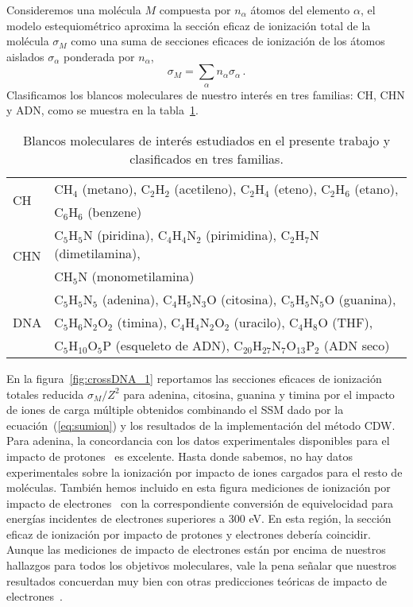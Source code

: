 Consideremos una molécula $M$ compuesta por $n_{\alpha}$ átomos del 
elemento $\alpha$, el modelo estequiométrico aproxima la sección eficaz 
de ionización total de la molécula $\sigma_{M}$ como una suma de 
secciones eficaces de ionización de los átomos aislados $\sigma_{\alpha}$ 
ponderada por $n_{\alpha}$, 
\begin{equation}
 \sigma_{M}=\sum\limits_{\alpha}n_{\alpha}\sigma_{\alpha}\,.  
 \label{eq:sumion}
\end{equation}
Clasificamos los blancos moleculares de nuestro interés en tres 
familias: CH, CHN y ADN, como se muestra en la tabla~\ref{tab:families}.

\begin{table}[t]
\begin{center}
\begin{tabular}{|p{}|p{}|}
\hline
\multirow{2}{*}{CH} & CH$_4$ (metano), C$_2$H$_2$ (acetileno), C$_2$H$_4$ (eteno), C$_2$H$_6$ (etano), \\ & C$_6$H$_6$ (benzene) \\
\hline
\multirow{2}{*}{CHN} & C$_5$H$_5$N (piridina), C$_4$H$_4$N$_2$ (pirimidina), C$_2$H$_7$N (dimetilamina), \\ & CH$_5$N (monometilamina) \\
\hline
\multirow{4}{*}{DNA} & C$_5$H$_5$N$_5$ (adenina), C$_4$H$_5$N$_3$O (citosina), C$_5$H$_5$N$_5$O (guanina), \\ & C$_5$H$_6$N$_2$O$_2$ (timina), C$_4$H$_4$N$_2$O$_2$ (uracilo), C$_4$H$_8$O (THF), \\
      & C$_5$H$_{10}$O$_5$P (esqueleto de ADN), C$_{20}$H$_{27}$N$_7$O$_{13}$P$_2$ 
(ADN seco) \\
\hline
\end{tabular}
\caption[Blancos moleculares estudiados y clasificados en tres familias.]
{Blancos moleculares de interés estudiados en el presente trabajo y 
clasificados en tres familias.}
\label{tab:families}
\end{center}
\end{table}

En la figura~\ref{fig:crossDNA_1} reportamos las secciones eficaces de 
ionización totales reducida $\sigma_M/Z^2$ para adenina, citosina, 
guanina y timina por el impacto de iones de carga múltiple obtenidos 
combinando el SSM dado por la ecuación~(\ref{eq:sumion}) y los 
resultados de la implementación del método CDW. Para adenina, la 
concordancia con los datos experimentales disponibles para el impacto 
de protones~\cite{iriki2011} es excelente. Hasta donde sabemos, no hay 
datos experimentales sobre la ionización por impacto de iones cargados 
para el resto de moléculas. También hemos incluido en esta figura 
mediciones de ionización por impacto de electrones~\cite{rahman2016} 
con la correspondiente conversión de equivelocidad para energías 
incidentes de electrones superiores a 300 eV. En esta región, la 
sección eficaz de ionización por impacto de protones y electrones 
debería coincidir. Aunque las mediciones de impacto de electrones están 
por encima de nuestros hallazgos para todos los objetivos moleculares, 
vale la pena señalar que nuestros resultados concuerdan muy bien con 
otras predicciones teóricas de impacto de 
electrones~\cite{mozejko2003,tan2018}. 


